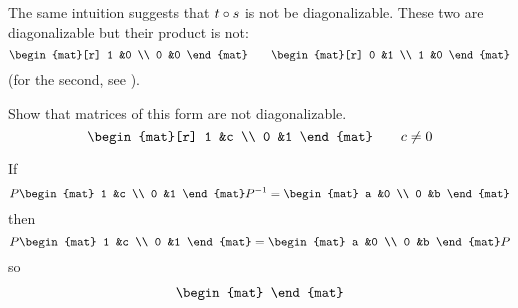 \begin{exercises}
\begin{answer}
     The same intuition suggests that \( t\mathbin\circ s \) is not
     be diagonalizable.
     These two are diagonalizable but their product is not:
     \begin{equation*}
        \begin{mat}[r]
           1  &0  \\
           0  &0
        \end{mat}
        \qquad
        \begin{mat}[r]
           0  &1  \\
           1  &0
        \end{mat}
     \end{equation*}
     (for the second, see ).   
    \end{answer}
  \recommended \item 
    Show that matrices of this form are not diagonalizable.
    \begin{equation*}
       \begin{mat}[r]
          1  &c  \\
          0  &1
       \end{mat}
       \qquad c\neq 0
    \end{equation*}
    \begin{answer}
      If
      \begin{equation*}
         P
         \begin{mat}
            1  &c  \\
            0  &1
         \end{mat}
         P^{-1}
         =
         \begin{mat}
            a  &0  \\
            0  &b
         \end{mat}
      \end{equation*}
      then
      \begin{equation*}
         P
         \begin{mat}
            1  &c  \\
            0  &1
         \end{mat}
         =
         \begin{mat}
            a  &0  \\
            0  &b
         \end{mat}
         P
      \end{equation*}
      so
      \begin{align*}
         \begin{mat}

\end{mat}
\end{align*}
\end{answer}
\end{exercises}
